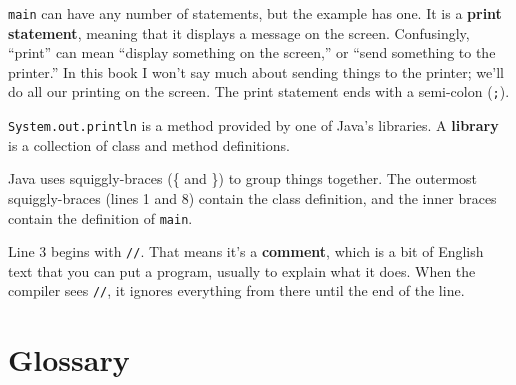\documentclass[12pt]{book}
\theoremstyle{definition}
\begin{document}

{\tt main} can have any number of statements, but the example has one.
It is a {\bf print statement}, meaning that it displays a message on
the screen.  Confusingly, ``print'' can mean ``display something on
the screen,'' or ``send something to the printer.''  In this book I
won't say much about sending things to the printer; we'll do all our
printing on the screen.  The print statement ends with a semi-colon
({\tt ;}).

{\tt System.out.println} is a method provided by one of Java's
libraries.  A {\bf library} is a collection of class and method
definitions.

Java uses squiggly-braces (\{ and \}) to group things together.  The
outermost squiggly-braces (lines 1 and 8) contain the class
definition, and the inner braces contain the definition of {\tt main}.


Line 3 begins with {\tt //}.  That means it's 
a {\bf comment}, which is a bit of
English text that you can put a program,
usually to explain what it does.  When the compiler
sees {\tt //}, it ignores everything from there until the end
of the line.


\section{Glossary}
\end{document}
